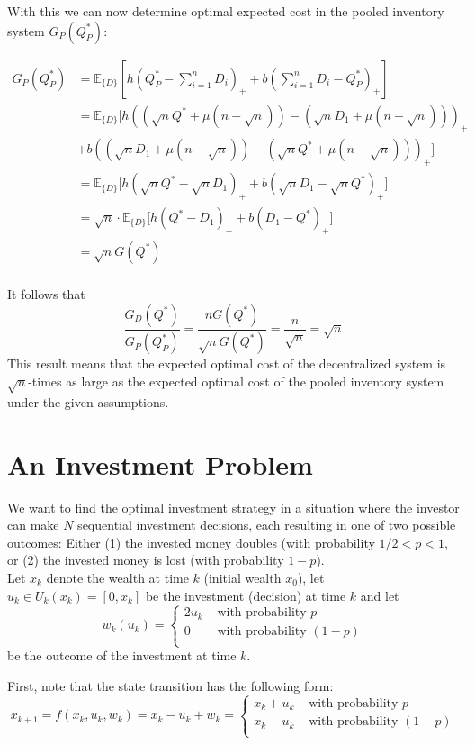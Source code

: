 \documentclass[11pt, oneside]{article}   	%
\begin{document}
With this we can now determine optimal expected cost in the pooled inventory system $G_P(Q_P^*)$:

\begin{align*}
G_P(Q_P^*) &=  \mathbb{E}_{\{D\}}\left[h(Q_P^* - \sum_{i=1}^n D_i)_+ + b(\sum_{i=1}^n D_i - Q_P^*)_+\right]\\
&=  \mathbb{E}_{\{D\}}\big[h((\sqrt{n} Q^* + \mu (n-\sqrt{n})) - (\sqrt{n}D_1 + \mu (n-\sqrt{n})))_+ \\
&+ b((\sqrt{n}D_1 + \mu (n-\sqrt{n})) - (\sqrt{n} Q^* + \mu (n-\sqrt{n})))_+\big]\\
&=  \mathbb{E}_{\{D\}}\big[h(\sqrt{n} Q^* - \sqrt{n}D_1)_+ + b(\sqrt{n}D_1 - \sqrt{n} Q^* )_+\big]\\
&=  \sqrt{n} \cdot \mathbb{E}_{\{D\}}\big[h( Q^* - D_1)_+ + b(D_1 -  Q^* )_+\big]\\
&=  \sqrt{n} G(Q^*)\\
\end{align*}

It follows that
$$
\frac{G_D(Q^*)}{G_P(Q_P^*)} = \frac{n G(Q^*)}{\sqrt{n} G(Q^*)} = \frac{n}{\sqrt{n}} = \sqrt{n} 
$$
This result means that the expected optimal cost of the decentralized system is $\sqrt{n}$-times as large as the expected optimal cost of the pooled inventory system under the given assumptions.


\section{An Investment Problem}
We want to find the optimal investment strategy in a situation where the investor can make $N$ sequential investment decisions, each resulting in one of two possible outcomes: Either (1) the invested money doubles (with probability $1/2 < p < 1$, or (2) the invested money is lost (with probability $1-p$). \\

Let $x_k$ denote the wealth at time $k$ (initial wealth $x_0$), let $u_k \in U_k(x_k) = [0, x_k]$ be the investment (decision) at time $k$ and let 
$$
w_k(u_k) = 
\begin{cases} 
2 u_k & \text{ with probability } p\\
0 & \text{ with probability } (1-p)\\
\end{cases}
$$
be the outcome of the investment at time $k$. 

First, note that the state transition has the following form:
$$
x_{k+1} = f(x_k,u_k,w_k) = x_k - u_k + w_k = 
\begin{cases} 
x_k + u_k & \text{ with probability } p\\
x_k - u_k & \text{ with probability } (1-p)\\
\end{cases}
$$ 
\end{document}
